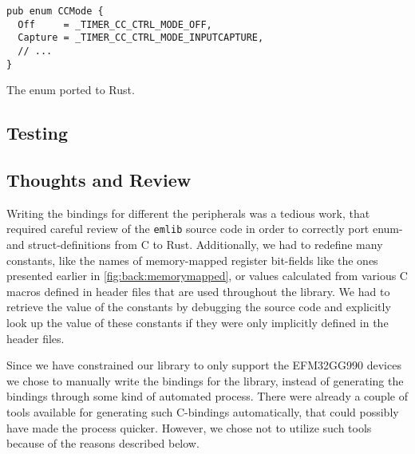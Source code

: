 \begin{listing}[h]
\begin{verbatim}
pub enum CCMode {
  Off     = _TIMER_CC_CTRL_MODE_OFF,
  Capture = _TIMER_CC_CTRL_MODE_INPUTCAPTURE,
  // ...
}
\end{verbatim}
\caption{The enum ported to Rust.}
\label{lst:enum_naming_rust}
\end{listing}

\subsection{Testing}
\label{ssub:testing}


\subsection{Thoughts and Review}


Writing the bindings for different the peripherals was a tedious work, that required careful review of the \texttt{emlib} source code in order to correctly port enum- and struct-definitions from C to Rust.
Additionally, we had to redefine many constants, like the names of memory-mapped register bit-fields like the ones presented earlier in \autoref{fig:back:memorymapped}, or values calculated from various C macros defined in header files that are used throughout the library.
We had to retrieve the value of the constants by debugging the source code and explicitly look up the value of these constants if they were only implicitly defined in the header files.

Since we have constrained our library to only support the EFM32GG990 devices we chose to manually write the bindings for the library, instead of generating the bindings through some kind of automated process.
There were already a couple of tools available for generating such C-bindings automatically, that could possibly have made the process quicker.
However, we chose not to utilize such tools because of the reasons described below.

